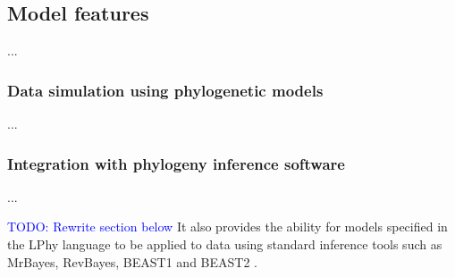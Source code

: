 \documentclass[10pt,letterpaper,table]{article}
\begin{document}
{%






\subsection{Model features}
...

\subsubsection{Data simulation using phylogenetic models}
...

\subsubsection{Integration with phylogeny inference software}
...

\textcolor{blue}{TODO: Rewrite section below}
It also provides the ability for models specified in the LPhy language to be applied to data using standard inference tools
such as MrBayes, RevBayes, BEAST1 and BEAST2
\cite{bouckaert2014beastanalysis,DrummondBouckaert2015,bouckaert2019beastanalysis}.

}
\end{document}
